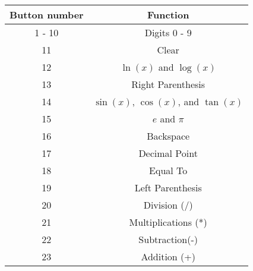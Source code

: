  \begin{table}[h!]
    \centering
    \begin{tabular}{|c|c|}
        \hline
        \textbf{Button number}  & \textbf{Function} \\
        \hline
           1 - 10 & Digits 0 - 9 \\
           11 & Clear \\
           12 & $\ln{(x)}$ and $\log{(x)}$ \\
           13 & Right Parenthesis \\
           14 & $\sin{(x)}$, $\cos{(x)}$, and $\tan{(x)}$ \\
           15 & $e$ and $\pi$ \\
           16 & Backspace \\
           17 & Decimal Point \\
           18 & Equal To \\
           19 & Left Parenthesis \\
           20 & Division (/)\\
           21 & Multiplications (*)\\
           22 & Subtraction(-) \\
           23 & Addition (+) \\
        \hline
    \end{tabular}
\end{table}
